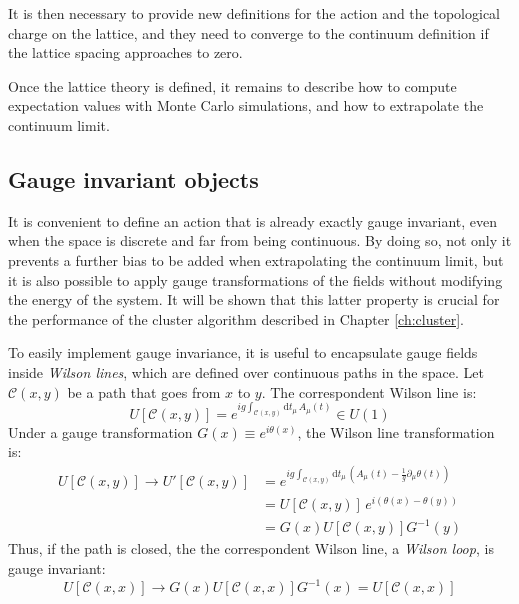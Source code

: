 It is then necessary to provide new definitions for the action and the topological charge on the lattice,
and they need to converge to the continuum definition if the lattice spacing approaches to zero.

Once the lattice theory is defined, it remains to describe how to compute expectation values with Monte Carlo simulations, and how to extrapolate the continuum limit.

\subsection*{Gauge invariant objects}

It is convenient to define an action that is already exactly gauge invariant, even when the space is discrete and far from being continuous.
By doing so, not only it prevents a further bias to be added when extrapolating the continuum limit,
but it is also possible to apply gauge transformations of the fields without modifying the energy of the system.
It will be shown that this latter property is crucial for the performance of the cluster algorithm described in Chapter \ref{ch:cluster}.

To easily implement gauge invariance, it is useful to encapsulate gauge fields inside \emph{Wilson lines}, which are defined over continuous paths in the space.
Let $\mathcal C(x,y)$ be a path that goes from $x$ to $y$. The correspondent Wilson line is:
\[
    U[\mathcal C(x,y)] = e^{ig\int_{\mathcal C(x,y)}\mathrm dt_\mu\,A_\mu(t)} \in U(1)
\]
Under a gauge transformation $G(x) \equiv e^{i\theta(x)}$, the Wilson line transformation is:
\begin{equation}\label{eq:path_gauge}
    \begin{aligned}
    U[\mathcal C(x,y)] \rightarrow U'[\mathcal C(x,y)] &= e^{ig\int_{\mathcal C(x,y)}\mathrm dt_\mu\,\left(A_\mu(t) - \frac{1}{g}\partial_\mu\theta(t)\right)} \\
                                                       &= U[\mathcal C(x,y)]\,e^{i(\theta(x) - \theta(y))} \\
                                                       &= G(x)U[\mathcal C(x,y)]G^{-1}(y)
    \end{aligned}
\end{equation}
Thus, if the path is closed, the the correspondent Wilson line, \ie a \emph{Wilson loop}, is gauge invariant:
\[
    U[\mathcal C(x,x)] \rightarrow G(x)U[\mathcal C(x,x)]G^{-1}(x) = U[\mathcal C(x,x)]
\]

